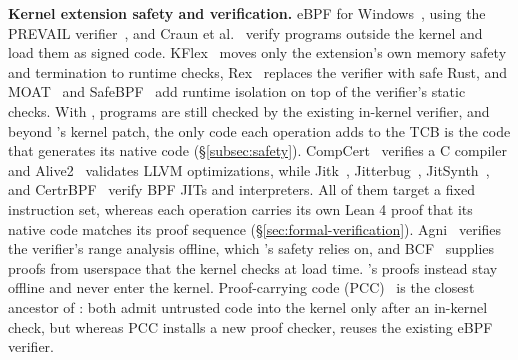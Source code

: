 \noindent\textbf{Kernel extension safety and verification.}
eBPF for Windows~\cite{windows-ebpf}, using the PREVAIL verifier~\cite{gershuni2019simple}, and Craun et al.~\cite{craun2023enabling} verify programs outside the kernel and load them as signed code.
KFlex~\cite{dwivedi2024fast} moves only the extension's own memory safety and termination to runtime checks, Rex~\cite{jia2025rex} replaces the verifier with safe Rust, and MOAT~\cite{lu2024moat} and SafeBPF~\cite{soo2024safebpf} add runtime isolation on top of the verifier's static checks.
With \tool, programs are still checked by the existing in-kernel verifier, and beyond \tool's kernel patch, the only code each operation adds to the TCB is the code that generates its native code (\S\ref{subsec:safety}).
CompCert~\cite{leroy2009formal} verifies a C compiler and Alive2~\cite{lopes2021alive2} validates LLVM optimizations, while Jitk~\cite{wang2014jitk}, Jitterbug~\cite{nelson2020specification}, JitSynth~\cite{vangeffen2020jitsynth}, and CertrBPF~\cite{yuan2022certrbpf} verify BPF JITs and interpreters.
All of them target a fixed instruction set, whereas each \lang operation carries its own Lean 4 proof that its native code matches its proof sequence (\S\ref{sec:formal-verification}).
Agni~\cite{vishwanathan2023verifying} verifies the verifier's range analysis offline, which \tool's safety relies on, and BCF~\cite{sun2025prove} supplies proofs from userspace that the kernel checks at load time. \lang's proofs instead stay offline and never enter the kernel.
Proof-carrying code (PCC)~\cite{necula1997pcc} is the closest ancestor of \tool: both admit untrusted code into the kernel only after an in-kernel check, but whereas PCC installs a new proof checker, \tool reuses the existing eBPF verifier.

